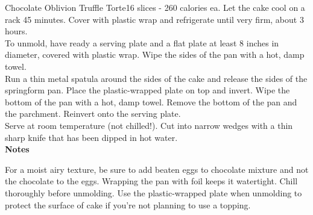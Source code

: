 \begin{recipe}{Chocolate Oblivion Truffle Torte}{16 slices - 260 calories ea.}{}
Let the cake cool on a rack 45 minutes. Cover with plastic wrap and refrigerate until very firm, about 3 hours.\\

To unmold, have ready a serving plate and a flat plate at least 8 inches in diameter, covered with plastic wrap. Wipe the sides of the pan with a hot, damp towel.\\

Run a thin metal spatula around the sides of the cake and release the sides of the springform pan. Place the plastic-wrapped plate on top and invert. Wipe the bottom of the pan with a hot, damp towel. Remove the bottom of the pan and the parchment. Reinvert onto the serving plate.\\

Serve at room temperature (not chilled!). Cut into narrow wedges with a thin sharp knife that has been dipped in hot water.\\

\textbf{Notes}

For a moist airy texture, be sure to add beaten eggs to chocolate mixture and not the chocolate to the eggs. Wrapping the pan with foil keeps it watertight. Chill thoroughly before unmolding. Use the plastic-wrapped plate when unmolding to protect the surface of cake if you're not planning to use a topping.

\end{recipe}